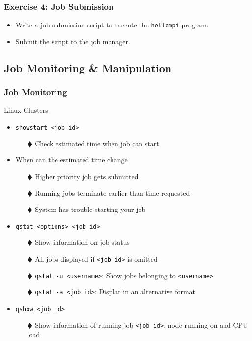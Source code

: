 \documentclass[slidestop,mathserif,compress,xcolor=svgnames,table]{beamer}
\newenvironment{bblock}[0]
{
\begin{beamerboxesrounded}[upper=uppercol1,lower=lowercol1,shadow=true]}
{\end{beamerboxesrounded}}
\newenvironment{eblock}[0]
{
\begin{beamerboxesrounded}[upper=uppercol2,lower=lowercol2,shadow=true]}
{\end{beamerboxesrounded}}
\begin{document}
\begin{frame}
  \frametitle{\small Exercise 4: Job Submission}
  \begin{eblock}{}
    \begin{itemize}
      \item Write a job submission script to execute the \texttt{hellompi} program.
      \item Submit the script to the job manager.
    \end{itemize}
  \end{eblock}
\end{frame}


\subsection{Job Monitoring \& Manipulation}
\begin{frame}
  \frametitle{\small Job Monitoring}
  \begin{bblock}{Linux Clusters}
    \begin{itemize}
      \item \texttt{showstart <job id>}
      \begin{enumerate}
	\item[$\vardiamond$] Check estimated time when job can start
      \end{enumerate}
      \item When can the estimated time change
      \begin{enumerate}
	\item[$\vardiamond$] Higher priority job gets submitted
	\item[$\vardiamond$] Running jobs terminate earlier than time requested
	\item[$\vardiamond$] System has trouble starting your job
      \end{enumerate}
      \item \texttt{qstat <options> <job id>}
      \begin{enumerate}
	\item[$\vardiamond$] Show information on job status
	\item[$\vardiamond$] All jobs displayed if \texttt{<job id>} is omitted
	\item[$\vardiamond$] \texttt{qstat -u <username>}: Show jobs belonging to \texttt{<username>}
	\item[$\vardiamond$] \texttt{qstat -a <job id>}: Displat in an alternative format
      \end{enumerate}
      \item \texttt{qshow <job id>}
      \begin{enumerate}
	\item[$\vardiamond$] Show information of running job \texttt{<job id>}: node running on and CPU load
      \end{enumerate}
    \end{itemize}
  \end{bblock}
\end{frame}
\end{document}
